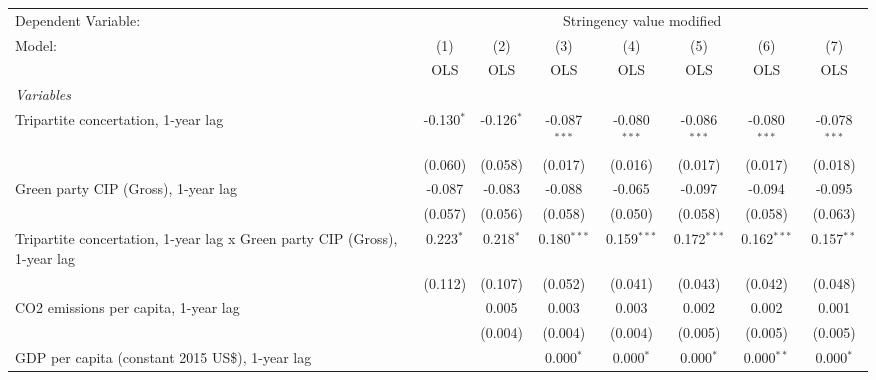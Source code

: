 
\begingroup
\centering
\begin{tabular}{lccccccc}
   \toprule
   Dependent Variable: & \multicolumn{7}{c}{Stringency value modified}\\
   Model:                                                                    & (1)          & (2)          & (3)            & (4)            & (5)            & (6)            & (7)\\  
                                                                             &  OLS         & OLS          & OLS            & OLS            & OLS            & OLS            & OLS\\  
   \midrule
   \emph{Variables}\\
   Tripartite concertation, 1-year lag                                       & -0.130$^{*}$ & -0.126$^{*}$ & -0.087$^{***}$ & -0.080$^{***}$ & -0.086$^{***}$ & -0.080$^{***}$ & -0.078$^{***}$\\   
                                                                             & (0.060)      & (0.058)      & (0.017)        & (0.016)        & (0.017)        & (0.017)        & (0.018)\\   
   Green party CIP (Gross), 1-year lag                                       & -0.087       & -0.083       & -0.088         & -0.065         & -0.097         & -0.094         & -0.095\\   
                                                                             & (0.057)      & (0.056)      & (0.058)        & (0.050)        & (0.058)        & (0.058)        & (0.063)\\   
   Tripartite concertation, 1-year lag x Green party CIP (Gross), 1-year lag & 0.223$^{*}$  & 0.218$^{*}$  & 0.180$^{***}$  & 0.159$^{***}$  & 0.172$^{***}$  & 0.162$^{***}$  & 0.157$^{**}$\\   
                                                                             & (0.112)      & (0.107)      & (0.052)        & (0.041)        & (0.043)        & (0.042)        & (0.048)\\   
   CO2 emissions per capita, 1-year lag                                      &              & 0.005        & 0.003          & 0.003          & 0.002          & 0.002          & 0.001\\   
                                                                             &              & (0.004)      & (0.004)        & (0.004)        & (0.005)        & (0.005)        & (0.005)\\   
   GDP per capita (constant 2015 US\$), 1-year lag                           &              &              & 0.000$^{*}$    & 0.000$^{*}$    & 0.000$^{*}$    & 0.000$^{**}$   & 0.000$^{*}$\\   

\end{tabular}

